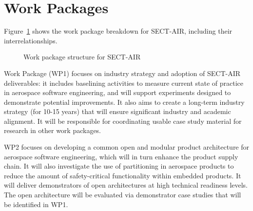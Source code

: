 \section{Work Packages}
\label{sec:work-packages}

Figure~\ref{fig:wps} shows the work package breakdown for SECT-AIR, including their interrelationships. 

\begin{figure}[htbp]
\centerline{}
\caption{Work package structure for SECT-AIR}
\label{fig:wps}
\end{figure}

Work Package (WP1) focuses
on industry strategy and adoption of SECT-AIR deliverables: it includes baselining activities to measure current state of practice in aerospace software engineering, and will
support experiments designed to demonstrate potential improvements. It also aims to create a long-term industry strategy (for 10-15 years)
that will ensure significant industry and academic alignment. It will be responsible for coordinating usable case study material for research in other work
packages.

WP2 focuses on developing a common open and modular product architecture for aerospace software engineering, which will in turn enhance the product
supply chain. It will also investigate the use of partitioning in aerospace products to reduce the amount of safety-critical functionality within embedded products.
It will deliver demonstrators of open architectures at high technical readiness levels. The open architecture will be evaluated via demonstrator case studies that
will be identified in WP1.

